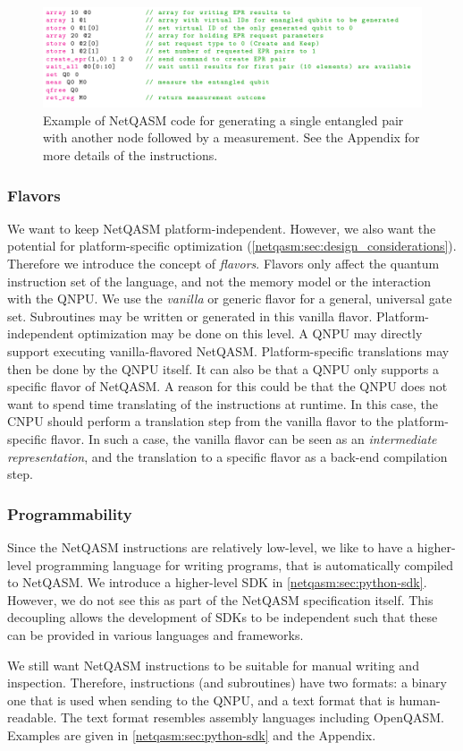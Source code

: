 \begin{figure}[t]
      \centering
      \includegraphics[width=0.6\linewidth]{figures/netqasm/nqasm_code_example}
      \caption{Example of NetQASM code for generating a single entangled pair with another node followed by a measurement.
            See the Appendix for more details of the instructions.}
      \label{fig:nqasm_code_example}
\end{figure}

\subsubsection{Flavors}
\label{netqasm:sec:design_decisions_flavours}
We want to keep \ac{NetQASM} platform-independent.
However, we also want the potential for platform-specific optimization (\cref{netqasm:sec:design_considerations}).
Therefore we introduce the concept of \textit{flavors}.
Flavors only affect the quantum instruction set of the language, and not the memory model or the interaction with the \ac{QNPU}.
We use the \textit{vanilla} or generic flavor for a general, universal gate set.
Subroutines may be written or generated in this vanilla flavor.
Platform-independent optimization may be done on this level.
A \ac{QNPU} may directly support executing vanilla-flavored \ac{NetQASM}.
Platform-specific translations may then be done by the \ac{QNPU} itself.
It can also be that a \ac{QNPU} only supports a specific flavor of \ac{NetQASM}.
A reason for this could be that the \ac{QNPU} does not want to spend time translating of the instructions at runtime.
In this case, the \ac{CNPU} should perform a translation step from the vanilla flavor to the platform-specific flavor.
In such a case, the vanilla flavor can be seen as an \textit{intermediate representation}, and the translation to a specific flavor as a back-end compilation step.

\subsubsection{Programmability}
Since the \ac{NetQASM} instructions are relatively low-level, we like to have a higher-level programming language for writing programs, that is automatically compiled to \ac{NetQASM}.
We introduce a higher-level SDK in \cref{netqasm:sec:python-sdk}.
However, we do not see this as part of the \ac{NetQASM} specification itself.
This decoupling allows the development of SDKs to be independent such that these can be provided in various languages and frameworks.

We still want \ac{NetQASM} instructions to be suitable for manual writing and inspection.
Therefore, instructions (and subroutines) have two formats: a binary one that is used when sending to the \ac{QNPU}, and a text format that is human-readable.
The text format resembles assembly languages including OpenQASM.
Examples are given in \cref{netqasm:sec:python-sdk} and the Appendix.